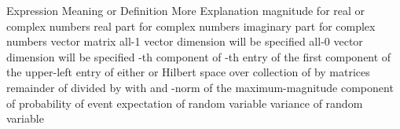 \starttitle [title={Notation}]

\starttable[|l|l|l|] \HL
Expression \VL Meaning or Definition \VL More Explanation \SR \HL
{} \VL magnitude \VL for real or complex numbers \AR \HL
{} \VL real part \VL for complex numbers \AR \HL
{} \VL imaginary part \VL for complex numbers \AR \HL
{} \VL vector \VL \AR \HL
{} \VL matrix \VL \AR \HL
{} \VL all-1 vector \VL dimension will be specified \AR \HL
{} \VL all-0 vector \VL dimension will be specified \AR \HL
{} \VL {}-th component of  \VL \AR \HL
{} \VL {}-th entry of  \VL \AR \HL
{} \VL the first component of  \VL  \AR \HL
{} \VL the upper-left entry of  \VL  \AR \HL
{} \VL either  or  \VL  \AR \HL
{} \VL Hilbert space  over  \VL  \AR \HL
{} \VL collection of  by  matrices \VL  \AR \HL
{} \VL remainder of  divided by  \VL with  and  \AR \HL
{} \VL {}-norm of  \VL {} \AR \HL
{} \VL the maximum-magnitude \VL  \AR
 \VL component of  \VL  \AR \HL
{} \VL probability of event  \VL  \AR \HL
{} \VL expectation of random variable  \VL  \AR \HL
{} \VL variance of random variable  \VL  \AR \HL
\stoptable


